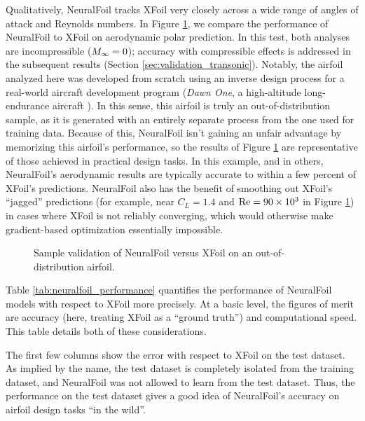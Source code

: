 \documentclass[conf]{new-aiaa}
\begin{document}
    Qualitatively, NeuralFoil tracks XFoil very closely across a wide range of angles of attack and Reynolds numbers. In Figure \ref{fig:clcd_polar}, we compare the performance of NeuralFoil to XFoil on aerodynamic polar prediction. In this test, both analyses are incompressible ($M_\infty=0$); accuracy with compressible effects is addressed in the subsequent results (Section \ref{sec:validation_transonic}). Notably, the airfoil analyzed here was developed from scratch using an inverse design process for a real-world aircraft development program (\emph{Dawn One}, a high-altitude long-endurance aircraft \cite{sharpe_optimization_2021, sharpe_tailerons_2023}). In this sense, this airfoil is truly an out-of-distribution sample, as it is generated with an entirely separate process from the one used for training data. Because of this, NeuralFoil isn't gaining an unfair advantage by memorizing this airfoil's performance, so the results of Figure \ref{fig:clcd_polar} are representative of those achieved in practical design tasks. In this example, and in others, NeuralFoil's aerodynamic results are typically accurate to within a few percent of XFoil's predictions. NeuralFoil also has the benefit of smoothing out XFoil's ``jagged'' predictions (for example, near $C_L=1.4$ and $\rm Re=90 \times 10^3$ in Figure \ref{fig:clcd_polar}) in cases where XFoil is not reliably converging, which would otherwise make gradient-based optimization essentially impossible.

    \begin{figure}[h]
        \centering
        
        \caption{Sample validation of NeuralFoil versus XFoil on an out-of-distribution airfoil.}
        \label{fig:clcd_polar}
    \end{figure}

    Table \ref{tab:neuralfoil_performance} quantifies the performance of NeuralFoil models with respect to XFoil more precisely. At a basic level, the figures of merit are accuracy (here, treating XFoil as a ``ground truth'') and computational speed. This table details both of these considerations.

    The first few columns show the error with respect to XFoil on the test dataset. As implied by the name, the test dataset is completely isolated from the training dataset, and NeuralFoil was not allowed to learn from the test dataset. Thus, the performance on the test dataset gives a good idea of NeuralFoil's accuracy on airfoil design tasks ``in the wild''.
\end{document}
